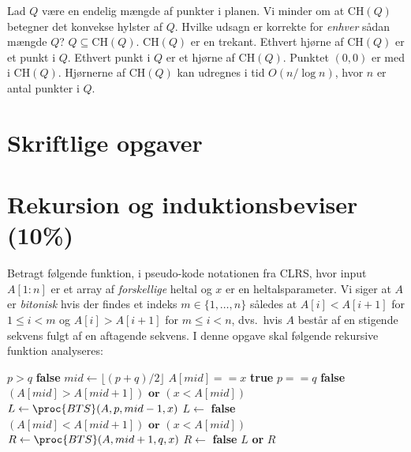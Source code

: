 Lad $Q$ være en endelig mængde af punkter i planen.
Vi minder om at $\text{CH}(Q)$ betegner det konvekse hylster af $Q$.
Hvilke udsagn er korrekte for \emph{enhver} sådan mængde $Q$?
\fleresvar
\mulighederstart
\svar $Q\subseteq\text{CH}(Q)$.\korrekt
\svar $\text{CH}(Q)$ er en trekant.
\svar Ethvert hjørne af $\text{CH}(Q)$ er et punkt i $Q$.\korrekt
\svar Ethvert punkt i $Q$ er et hjørne af $\text{CH}(Q)$.
\svar Punktet $(0,0)$ er med i $\text{CH}(Q)$.
\svar Hjørnerne af $\text{CH}(Q)$ kan udregnes i tid $O(n/\log n)$, hvor $n$ er antal punkter i $Q$.
\mulighederslut



\multiplechoiceslut

\newpage

\section*{Skriftlige opgaver}\label{sec:written}



\section{Rekursion og induktionsbeviser (10\%)}

Betragt følgende funktion, i pseudo-kode notationen fra CLRS, hvor input $A[1:n]$ er et array af \emph{forskellige} heltal og $x$ er en heltalsparameter.
Vi siger at $A$ er \emph{bitonisk} hvis der findes et indeks $m \in \{1,\dots,n\}$ således at $A[i] < A[i+1]$ for $1 \leq i < m$ og $A[i] > A[i+1]$ for $m\leq i < n$, dvs.~hvis $A$ består af en stigende sekvens fulgt af en aftagende sekvens.
I denne opgave skal følgende rekursive funktion analyseres:

\begin{codebox}
\li \If $p > q$ \Return \textbf{false}
\li $mid \gets \lfloor (p+q)/2 \rfloor$
\li \If $A[mid] == x$ \Return \textbf{true}
\li \ElseIf $p==q$ \Return \textbf{false}
\li \If $(A[mid] > A[mid+1]) \textbf{ or } (x < A[mid])$
\li \Then $L \gets \proc{BTS}(A, p, mid-1, x)$ 
\li \Else $L \gets$ \textbf{false}\End
\li \If $(A[mid] < A[mid+1]) \textbf{ or } (x < A[mid])$
\li \Then $R \gets \proc{BTS}(A, mid+1, q, x)$ 
\li \Else $R \gets$ \textbf{false} \End
\li \Return $L$ \textbf{ or } $R$
\end{codebox}

